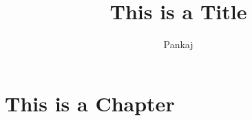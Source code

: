 \documentclass{pkStudyNotes}
\begin{document}
    \title{This is a Title}
    \author{Pankaj}
    \maketitle
  
    \chapter{This is a Chapter}
    \lipsum[1]

    \lipsum[2-4]
    
    
\end{document}
